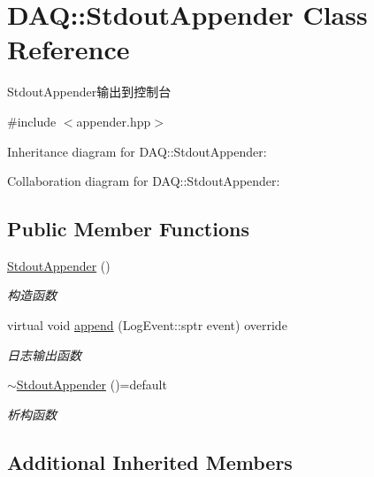\hypertarget{classDAQ_1_1StdoutAppender}{}\section{D\+AQ\+:\+:Stdout\+Appender Class Reference}
\label{classDAQ_1_1StdoutAppender}


Stdout\+Appender输出到控制台  




{\ttfamily \#include $<$appender.\+hpp$>$}



Inheritance diagram for D\+AQ\+:\+:Stdout\+Appender\+:


Collaboration diagram for D\+AQ\+:\+:Stdout\+Appender\+:
\subsection*{Public Member Functions}
\begin{DoxyCompactItemize}
\item 
\mbox{\label{classDAQ_1_1StdoutAppender_a20b5fd5c1588f68febaf57dfd650bd19}} 
\hyperlink{classDAQ_1_1StdoutAppender_a20b5fd5c1588f68febaf57dfd650bd19}{Stdout\+Appender} ()
\begin{DoxyCompactList}\small\item\em 构造函数 \end{DoxyCompactList}\item 
virtual void \hyperlink{classDAQ_1_1StdoutAppender_a012a068aa3532d7f1b3459ff11107231}{append} (Log\+Event\+::sptr event) override
\begin{DoxyCompactList}\small\item\em 日志输出函数 \end{DoxyCompactList}\item 
\mbox{\label{classDAQ_1_1StdoutAppender_af4a6d0fa0a5bb6001930a0f685770bae}} 
\hyperlink{classDAQ_1_1StdoutAppender_af4a6d0fa0a5bb6001930a0f685770bae}{$\sim$\+Stdout\+Appender} ()=default
\begin{DoxyCompactList}\small\item\em 析构函数 \end{DoxyCompactList}\end{DoxyCompactItemize}
\subsection*{Additional Inherited Members}


